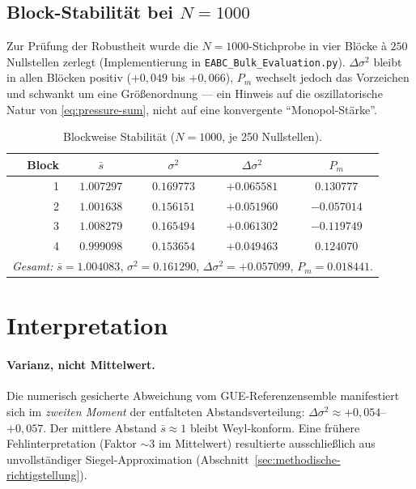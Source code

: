 \documentclass[11pt,a4paper]{article}
\newcommand{\bulkThousandMean}{1.004083}
\newcommand{\bulkThousandVar}{0.161290}
\newcommand{\bulkThousandDelta}{0.057099}
\newcommand{\bulkThousandPm}{0.018441}
\newcommand{\blkOneMean}{1.007297}
\newcommand{\blkOneVar}{0.169773}
\newcommand{\blkOneDelta}{0.065581}
\newcommand{\blkOnePm}{0.130777}
\newcommand{\blkTwoMean}{1.001638}
\newcommand{\blkTwoVar}{0.156151}
\newcommand{\blkTwoDelta}{0.051960}
\newcommand{\blkTwoPm}{-0.057014}
\newcommand{\blkThreeMean}{1.008279}
\newcommand{\blkThreeVar}{0.165494}
\newcommand{\blkThreeDelta}{0.061302}
\newcommand{\blkThreePm}{-0.119749}
\newcommand{\blkFourMean}{0.999098}
\newcommand{\blkFourVar}{0.153654}
\newcommand{\blkFourDelta}{0.049463}
\newcommand{\blkFourPm}{0.124070}
\begin{document}
\subsection{Block-Stabilität bei $N=1000$}

Zur Prüfung der Robustheit wurde die $N=1000$-Stichprobe in vier Blöcke à $250$
Nullstellen zerlegt (Implementierung in \texttt{EABC\_Bulk\_Evaluation.py}).
$\Delta\sigma^2$ bleibt in allen Blöcken positiv ($+0{,}049$ bis $+0{,}066$),
$P_m$ wechselt jedoch das Vorzeichen und schwankt um eine Größenordnung
--- ein Hinweis auf die oszillatorische Natur von \eqref{eq:pressure-sum},
nicht auf eine konvergente ``Monopol-Stärke''.

\begin{table}[htbp]
\centering
\caption{Blockweise Stabilität ($N=1000$, je 250 Nullstellen).}
\label{tab:block-stabilitaet}
\begin{tabular}{rcccc}
\toprule
Block & $\bar{s}$ & $\sigma^2$ & $\Delta\sigma^2$ & $P_m$ \\
\midrule
1 & $\blkOneMean$   & $\blkOneVar$   & $+\blkOneDelta$   & $\blkOnePm$   \\
2 & $\blkTwoMean$   & $\blkTwoVar$   & $+\blkTwoDelta$   & $\blkTwoPm$   \\
3 & $\blkThreeMean$ & $\blkThreeVar$ & $+\blkThreeDelta$ & $\blkThreePm$ \\
4 & $\blkFourMean$  & $\blkFourVar$  & $+\blkFourDelta$  & $\blkFourPm$  \\
\midrule
\multicolumn{5}{l}{\textit{Gesamt:} $\bar{s}=\bulkThousandMean$,
  $\sigma^2=\bulkThousandVar$,
  $\Delta\sigma^2=+\bulkThousandDelta$,
  $P_m=\bulkThousandPm$.}
\end{tabular}
\end{table}

\section{Interpretation}
\label{sec:interpretation}

\paragraph{Varianz, nicht Mittelwert.}
Die numerisch gesicherte Abweichung vom GUE-Referenzensemble manifestiert sich
im \emph{zweiten Moment} der entfalteten Abstandsverteilung:
$\Delta\sigma^2 \approx +0{,}054$--$+0{,}057$.
Der mittlere Abstand $\bar{s}\approx 1$ bleibt Weyl-konform.
Eine frühere Fehlinterpretation (Faktor $\sim 3$ im Mittelwert) resultierte
ausschließlich aus unvollständiger Siegel-Approximation
(Abschnitt~\ref{sec:methodische-richtigstellung}).
\end{document}
